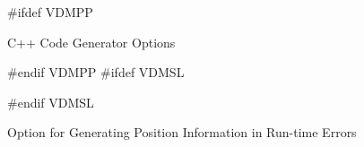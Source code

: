 \documentclass[\pformat,12pt]{article}
\begin{document}
\begin{figure}[tbh]
\begin{center}
\mbox{}
#ifdef VDMPP
\caption{C++ Code Generator Options}\label{fig:option}
#endif VDMPP
#ifdef VDMSL
\caption{Option for Generating Position Information in Run-time Errors}\label{fig:option}
#endif VDMSL
\end{center}
\end{figure}
  
\end{document}
